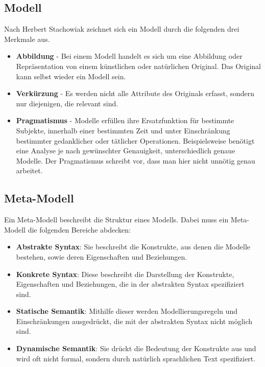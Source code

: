 \subsection{Modell}
Nach Herbert Stachowiak \cite{Stachowiak1973} zeichnet sich ein Modell durch die folgenden drei Merkmale aus.
\begin{itemize}
\item \textbf{Abbildung} - Bei einem Modell handelt es sich um eine Abbildung oder Repräsentation von einem künstlichen oder natürlichen Original. Das Original kann selbst wieder ein Modell sein. 
\item \textbf{Verkürzung} - Es werden nicht alle Attribute des Originals erfasst, sondern nur diejenigen, die relevant sind.
\item \textbf{Pragmatismus} - Modelle erfüllen ihre Ersatzfunktion für bestimmte Subjekte, innerhalb einer bestimmten Zeit und unter Einschränkung bestimmter gedanklicher oder tätlicher Operationen. Beispielsweise benötigt eine Analyse je nach gewünschter Genauigkeit, unterschiedlich genaue Modelle. Der Pragmatismus schreibt vor, dass man hier nicht unnötig genau arbeitet.
\end{itemize} 
\subsection{Meta-Modell}
Ein Meta-Modell beschreibt die Struktur eines Modells. Dabei muss ein Meta-Modell die folgenden Bereiche abdecken:
\begin{itemize}
\item \textbf{Abstrakte Syntax}: Sie beschreibt die Konstrukte, aus denen die Modelle bestehen, sowie deren Eigenschaften und Beziehungen.
\item \textbf{Konkrete Syntax}: Diese beschreibt die Darstellung der Konstrukte, Eigenschaften und Beziehungen, die in der abstrakten Syntax spezifiziert sind.
\item \textbf{Statische Semantik}: Mithilfe dieser werden Modellierungsregeln und Einschränkungen ausgedrückt, die mit der abstrakten Syntax nicht möglich sind.
\item \textbf{Dynamische Semantik}: Sie drückt die Bedeutung der Konstrukte aus und wird oft nicht formal, sondern durch natürlich sprachlichen Text spezifiziert.
\end{itemize}

